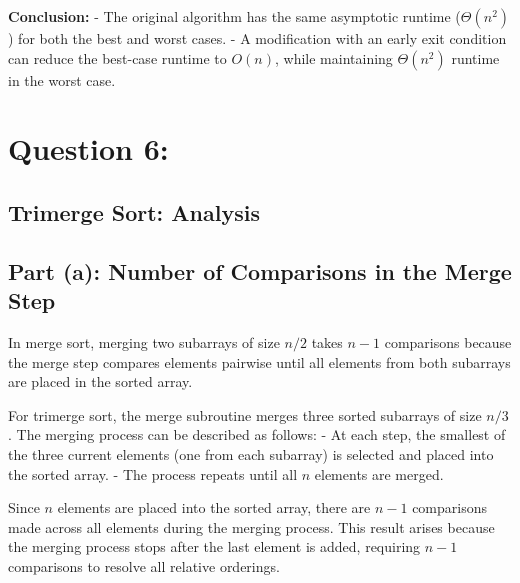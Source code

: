 \documentclass{article}
\begin{document}
\textbf{Conclusion:}
- The original algorithm has the same asymptotic runtime (\( \Theta(n^2) \)) for both the best and worst cases.
- A modification with an early exit condition can reduce the best-case runtime to \( O(n) \), while maintaining \( \Theta(n^2) \) runtime in the worst case.

\pagebreak
\section*{Question 6:}
\subsection*{Trimerge Sort: Analysis}



\subsection*{Part (a): Number of Comparisons in the Merge Step}

In merge sort, merging two subarrays of size \( n/2 \) takes \( n - 1 \) comparisons because the merge step compares elements pairwise until all elements from both subarrays are placed in the sorted array.

For trimerge sort, the merge subroutine merges three sorted subarrays of size \( n/3 \). The merging process can be described as follows:
- At each step, the smallest of the three current elements (one from each subarray) is selected and placed into the sorted array.
- The process repeats until all \( n \) elements are merged.

Since \( n \) elements are placed into the sorted array, there are \( n - 1 \) comparisons made across all elements during the merging process. This result arises because the merging process stops after the last element is added, requiring \( n - 1 \) comparisons to resolve all relative orderings.
\end{document}
